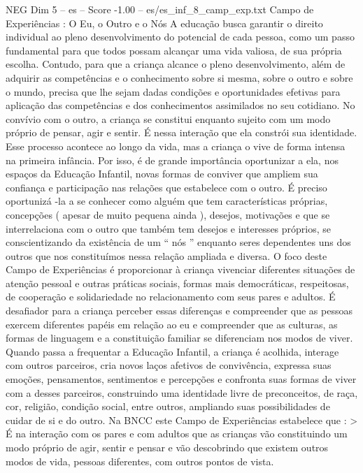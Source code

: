 \begin{textsample}{NEG Dim 5 – es – Score -1.00 – es/es\_inf\_8\_camp\_exp.txt}  \label{ex:f5_neg_184}
Campo de Experiências : O Eu, o Outro e o Nós A educação busca garantir o direito individual ao pleno desenvolvimento do potencial de cada pessoa, como um passo fundamental para que todos possam alcançar uma vida valiosa, de sua própria escolha.
Contudo, para que a criança alcance o pleno desenvolvimento, além de adquirir as competências e o conhecimento sobre si mesma, sobre o outro e sobre o mundo, precisa que lhe sejam dadas condições e oportunidades efetivas para aplicação das competências e dos conhecimentos assimilados no seu cotidiano.
No convívio com o outro, a criança se constitui enquanto sujeito com um modo próprio de pensar, agir e sentir.
É nessa interação que ela constrói sua identidade.
Esse processo acontece ao longo da vida, mas a criança o vive de forma intensa na primeira infância.
Por isso, é de grande importância oportunizar a ela, nos espaços da Educação Infantil, novas formas de conviver que ampliem sua confiança e participação nas relações que estabelece com o outro.
É preciso oportunizá -la a se conhecer como alguém que tem características próprias, concepções ( apesar de muito pequena ainda ), desejos, motivações e que se interrelaciona com o outro que também tem desejos e interesses próprios, se conscientizando da existência de um “ nós ” enquanto seres dependentes uns dos outros que nos constituímos nessa relação ampliada e diversa.
O foco deste Campo de Experiências é proporcionar à criança vivenciar diferentes situações de atenção pessoal e outras práticas sociais, formas mais democráticas, respeitosas, de cooperação e solidariedade no relacionamento com seus pares e adultos.
É desafiador para a criança perceber essas diferenças e compreender que as pessoas exercem diferentes papéis em relação ao eu e compreender que as culturas, as formas de linguagem e a constituição familiar se diferenciam nos modos de viver.
Quando passa a frequentar a Educação Infantil, a criança é acolhida, interage com outros parceiros, cria novos laços afetivos de convivência, expressa suas emoções, pensamentos, sentimentos e percepções e confronta suas formas de viver com a desses parceiros, construindo uma identidade livre de preconceitos, de raça, cor, religião, condição social, entre outros, ampliando suas possibilidades de cuidar de si e do outro.
Na BNCC este Campo de Experiências estabelece que : > É na interação com os pares e com adultos que as crianças vão constituindo um modo próprio de agir, sentir e pensar e vão descobrindo que existem outros modos de vida, pessoas diferentes, com outros pontos de vista.

\end{textsample}
